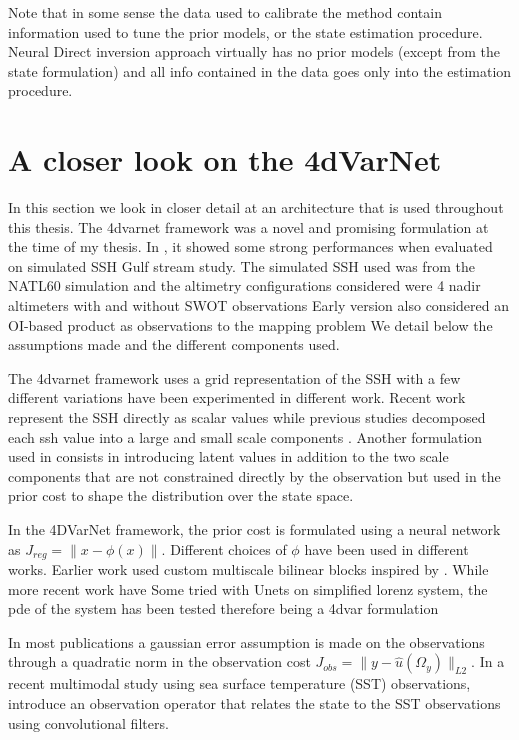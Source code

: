 \begin{bibunit}
Note that in some sense the data used to calibrate the method contain information used to tune the prior models, or the state estimation procedure.
Neural Direct inversion approach virtually has no prior models (except from the state formulation) and all info contained in the data goes only into the estimation procedure.

\section{A closer look on the 4dVarNet}
In this section we look in closer detail at an architecture that is used throughout this thesis.
The 4dvarnet framework was a novel and promising  formulation at the time of my thesis. In \cite{}, it showed some strong performances when evaluated on simulated SSH Gulf stream study.
The simulated SSH used was from the NATL60 simulation and the altimetry configurations considered were 4 nadir altimeters with and without SWOT observations
Early version also considered an OI-based product as observations to the mapping problem
We detail below the assumptions made and the different components used.

The 4dvarnet framework uses a grid representation of the SSH with a few different variations have been experimented in different work.
Recent work represent the SSH directly as scalar values\cite{} while previous studies decomposed each ssh value into a large and small scale components \cite{}.  Another formulation  used in \cite{} consists in introducing latent values in addition to the two scale components that are not constrained directly by the observation but used in the prior cost to shape the distribution over the state space.

In the 4DVarNet framework, the prior cost is formulated using a neural network \phi as $J_{reg}= \|x - \phi(x)\|$.
Different choices of $\phi$ have been used in different works. Earlier work\cite{} used custom multiscale bilinear blocks inspired by \cite{}.
While more recent work have 
Some tried with Unets
on simplified lorenz system, the pde of the system has been tested therefore being a 4dvar formulation

In most publications a gaussian error assumption is made on the observations through a quadratic norm in the observation cost $J_{obs}= \|y - \hat{u}(\Omega_y)\|_{L2}$.
In a recent multimodal study using sea surface temperature (SST) observations, introduce an observation operator that relates the state to the SST observations using convolutional filters.


\end{bibunit}
